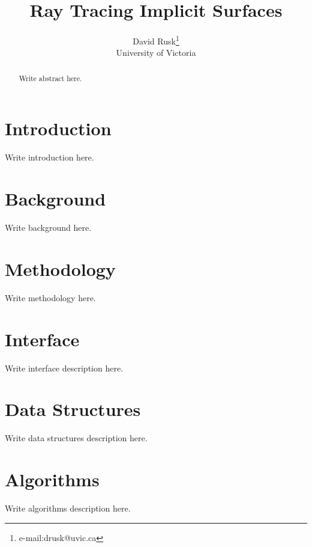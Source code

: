 \documentclass[conference]{acmsiggraph}
\title{Ray Tracing Implicit Surfaces}
\author{David Rusk\thanks{e-mail:drusk@uvic.ca}\\University of Victoria}
\begin{document}
\maketitle

\begin{abstract}

Write abstract here. \cite{Jobs95}

\end{abstract}

\keywordlist


\TOGlinkslist


\copyrightspace

\section{Introduction}

Write introduction here.

\section{Background}

Write background here.

\section{Methodology}

Write methodology here.

\section{Interface}

Write interface description here.

\section{Data Structures}

Write data structures description here.

\section{Algorithms}

Write algorithms description here.
\end{document}
